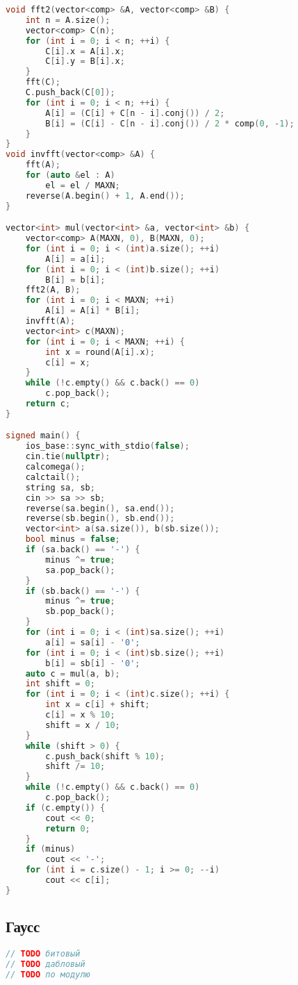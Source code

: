 \documentclass[10pt,a4paper,landscape,twosided]{extarticle}
\begin{document}
\begin{multicols*}{3}
\begin{lstlisting}[language=C++]
void fft2(vector<comp> &A, vector<comp> &B) {
    int n = A.size();
    vector<comp> C(n);
    for (int i = 0; i < n; ++i) {
        C[i].x = A[i].x;
        C[i].y = B[i].x;
    }
    fft(C);
    C.push_back(C[0]);
    for (int i = 0; i < n; ++i) {
        A[i] = (C[i] + C[n - i].conj()) / 2;
        B[i] = (C[i] - C[n - i].conj()) / 2 * comp(0, -1);
    }
}
void invfft(vector<comp> &A) {
    fft(A);
    for (auto &el : A)
        el = el / MAXN;
    reverse(A.begin() + 1, A.end());
}

vector<int> mul(vector<int> &a, vector<int> &b) {
    vector<comp> A(MAXN, 0), B(MAXN, 0);
    for (int i = 0; i < (int)a.size(); ++i)
        A[i] = a[i];
    for (int i = 0; i < (int)b.size(); ++i)
        B[i] = b[i];
    fft2(A, B);
    for (int i = 0; i < MAXN; ++i)
        A[i] = A[i] * B[i];
    invfft(A);
    vector<int> c(MAXN);
    for (int i = 0; i < MAXN; ++i) {
        int x = round(A[i].x);
        c[i] = x;
    }
    while (!c.empty() && c.back() == 0)
        c.pop_back();
    return c;
}

signed main() {
    ios_base::sync_with_stdio(false);
    cin.tie(nullptr);
    calcomega();
    calctail();
    string sa, sb;
    cin >> sa >> sb;
    reverse(sa.begin(), sa.end());
    reverse(sb.begin(), sb.end());
    vector<int> a(sa.size()), b(sb.size());
    bool minus = false;
    if (sa.back() == '-') {
        minus ^= true;
        sa.pop_back();
    }
    if (sb.back() == '-') {
        minus ^= true;
        sb.pop_back();
    }
    for (int i = 0; i < (int)sa.size(); ++i)
        a[i] = sa[i] - '0';
    for (int i = 0; i < (int)sb.size(); ++i)
        b[i] = sb[i] - '0';
    auto c = mul(a, b);
    int shift = 0;
    for (int i = 0; i < (int)c.size(); ++i) {
        int x = c[i] + shift;
        c[i] = x % 10;
        shift = x / 10;
    }
    while (shift > 0) {
        c.push_back(shift % 10);
        shift /= 10;
    }
    while (!c.empty() && c.back() == 0)
        c.pop_back();
    if (c.empty()) {
        cout << 0;
        return 0;
    }
    if (minus)
        cout << '-';
    for (int i = c.size() - 1; i >= 0; --i)
        cout << c[i];
}

\end{lstlisting}

\subsection{Гаусс}
\begin{lstlisting}[language=C++]
// TODO битовый
// TODO дабловый
// TODO по модулю



\end{lstlisting}
\end{multicols*}
\end{document}
